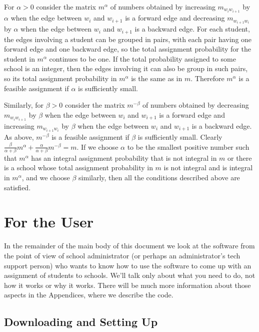 \documentclass[12pt]{article}
\theoremstyle{definition}
\begin{document}
For $\alpha > 0$ consider the matrix $m^\alpha$ of numbers obtained by
increasing $m_{w_iw_{i+1}}$ by $\alpha$ when the edge between $w_i$
and $w_{i+1}$ is a forward edge and decreasing $m_{w_{i+1}w_i}$ by
$\alpha$ when the edge between $w_i$ and $w_{i+1}$ is a backward edge.
For each student, the edges involving a student can be grouped in
pairs, with each pair having one forward edge and one backward edge,
so the total assignment probability for the student in $m^\alpha$
continues to be one.  If the total probability assigned to some school
is an integer, then the edges involving it can also be group in such
pairs, so its total assignment probability in $m^\alpha$ is the same
as in $m$.  Therefore $m^\alpha$ is a feasible assignment if $\alpha$
is sufficiently small.  

Similarly, for $\beta > 0$ consider the matrix $m^{-\beta}$ of numbers
obtained by decreasing $m_{w_iw_{i+1}}$ by $\beta$ when the edge
between $w_i$ and $w_{i+1}$ is a forward edge and increasing
$m_{w_{i+1}w_i}$ by $\beta$ when the edge between $w_i$ and $w_{i+1}$
is a backward edge.  As above, $m^{-\beta}$ is a feasible assignment
if $\beta$ is sufficiently small.  Clearly $\tfrac{\beta}{\alpha +
  \beta}m^\alpha + \tfrac{\alpha}{\alpha + \beta}m^{-\beta} = m$.  If
we choose $\alpha$ to be the smallest positive number such that
$m^\alpha$ has an integral assignment probability that is not integral
in $m$ or there is a school whose total assignment probability in $m$
is not integral and is integral in $m^\alpha$, and we choose $\beta$
similarly, then all the conditions described above are satisfied.


\section{For the User}

In the remainder of the main body of this document we look at the
software from the point of view of school administrator (or perhaps an
administrator's tech support person) who wants to know how to use the
software to come up with an assignment of students to schools.  We'll
talk only about what you need to do, not how it works or why it works.
There will be much more information about those aspects in the
Appendices, where we describe the code.

\subsection{Downloading and Setting Up} \label{subsec:DownloadInstall}
\end{document}
